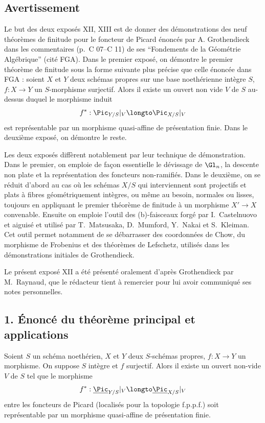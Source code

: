 \subsection*{Avertissement}

Le but des deux expos\'es XII, XIII est de donner des d\'emonstrations des neuf th\'eor\`emes de finitude pour le foncteur de Picard \'enonc\'es par A. Grothendieck dans les commentaires (p.\ C 07--C 11) de ses ``Fondements de la G\'eom\'etrie Alg\'ebrique'' (cit\'e FGA). Dans le premier expos\'e, on d\'emontre le premier th\'eor\`eme de finitude sous la forme suivante plus pr\'ecise que celle \'enonc\'ee dans FGA : soient $X$ et $Y$ deux sch\'emas propres sur une base noeth\'erienne int\`egre $S$, $f : X \to Y$ un $S$-morphisme surjectif. Alors il existe un ouvert non vide $V$ de $S$ au-dessus duquel le morphisme induit
\[
f^{*} : \Pic_{Y/S}|_{V} \longto \Pic_{X/S}|_{V}
\]
est repr\'esentable par un morphisme quasi-affine de pr\'esentation finie. Dans le deuxi\`eme expos\'e, on d\'emontre le reste.

Les deux expos\'es diff\`erent notablement par leur technique de d\'emonstration. Dans le premier, on emploie de fa\c con essentielle le d\'evissage de $\Gl_{n}$, la descente non plate et la repr\'esentation des foncteurs non-ramifi\'es. Dans le deuxi\`eme, on se r\'eduit d'abord au cas o\`u les sch\'emas $X/S$ qui interviennent sont projectifs et plats \`a fibres g\'eom\'etriquement int\`egres, ou m\^eme au besoin, normales ou lisses, toujours en appliquant le premier th\'eor\`eme de finitude \`a un morphisme $X' \to X$ convenable. Ensuite on emploie l'outil des (b)-faisceaux forg\'e par I.\ Castelnuovo et aiguis\'e et utilis\'e par T.\ Matsusaka, D.\ Mumford, Y.\ Nakai et S.\ Kleiman. Cet outil permet notamment de se d\'ebarrasser des coordonn\'ees de Chow, du morphisme de Frobenius et des th\'eor\`emes de Lefschetz, utilis\'es dans les d\'emonstrations initiales de Grothendieck.

Le pr\'esent expos\'e XII a \'et\'e pr\'esent\'e oralement d'apr\`es Grothendieck par M.\ Raynaud, que le r\'edacteur tient \`a remercier pour lui avoir communiqu\'e ses notes personnelles.

\subsection*{1. \'Enonc\'e du th\'eor\`eme principal et applications}

\begin{theoreme}[1.1]
Soient $S$ un sch\'ema noeth\'erien, $X$ et $Y$ deux $S$-sch\'emas propres, $f : X \to Y$ un morphisme. On suppose $S$ int\`egre et $f$ surjectif. Alors il existe un ouvert non-vide $V$ de $S$ tel que le morphisme
\[
f^{*} : \underline{\Pic}_{Y/S}|_{V} \longto \underline{\Pic}_{X/S}|_{V}
\]
entre les foncteurs de Picard (localis\'es pour la topologie f.p.p.f.) soit repr\'esentable par un morphisme quasi-affine de pr\'esentation finie.
\end{theoreme}

